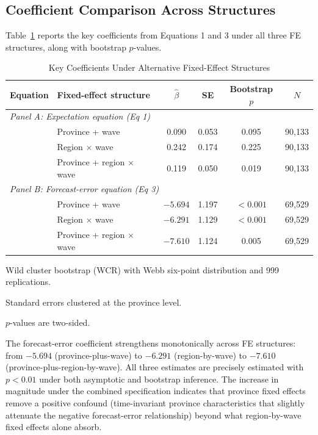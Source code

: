 \subsection{Coefficient Comparison Across Structures}

Table~\ref{tab:fe_coef_comparison} reports the key
coefficients from Equations 1 and 3 under all three FE
structures, along with bootstrap $p$-values.

\begin{table}[htbp]
\centering
\caption{Key Coefficients Under Alternative Fixed-Effect
  Structures}
\label{tab:fe_coef_comparison}
\begin{threeparttable}
\footnotesize
\begin{tabular}{llcccc}
\toprule
Equation & Fixed-effect structure & $\hat{\beta}$ & SE &
  Bootstrap $p$ & $N$ \\
\midrule
\multicolumn{6}{l}{\textit{Panel A: Expectation equation
  (Eq 1)}} \\
& Province + wave       & 0.090  & 0.053  & 0.095
  & 90,133 \\
& Region $\times$ wave & 0.242  & 0.174  & 0.225
  & 90,133 \\
& Province + region $\times$ wave & 0.119  & 0.050  & 0.019
  & 90,133 \\[6pt]
\multicolumn{6}{l}{\textit{Panel B: Forecast-error equation
  (Eq 3)}} \\
& Province + wave       & $-5.694$ & 1.197  & $<0.001$
  & 69,529 \\
& Region $\times$ wave & $-6.291$ & 1.129  & $<0.001$
  & 69,529 \\
& Province + region $\times$ wave & $-7.610$ & 1.124  & 0.005
  & 69,529 \\
\bottomrule
\end{tabular}
\begin{tablenotes}[flushleft]
\footnotesize
\item Wild cluster bootstrap (WCR) with Webb six-point
  distribution and 999 replications.
\item Standard errors clustered at the province level.
\item $p$-values are two-sided.
\end{tablenotes}
\end{threeparttable}
\end{table}

The forecast-error coefficient strengthens monotonically across
FE structures: from $-5.694$ (province-plus-wave) to $-6.291$
(region-by-wave) to $-7.610$ (province-plus-region-by-wave).
All three estimates are precisely estimated with $p < 0.01$
under both asymptotic and bootstrap inference.
The increase in magnitude under the combined specification
indicates that province fixed effects remove a positive
confound (time-invariant province characteristics that
slightly attenuate the negative forecast-error relationship)
beyond what region-by-wave fixed effects alone absorb.

